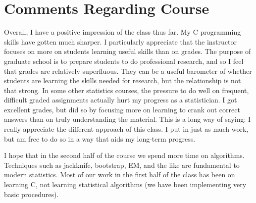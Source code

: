 \documentclass{report}
\begin{document}
\clearpage
\section*{Comments Regarding Course}

Overall, I have a positive impression of the class thus far. My C programming
skills have gotten much sharper. I particularly appreciate that the instructor
focuses on more on students learning useful skills than on grades. The purpose of
graduate school is to prepare students to do professional research, and so 
I feel that grades are relatively superfluous. They can be a useful
barometer of whether students are learning the skills needed for research, but the
relationship is not that strong. In some other statistics courses, the pressure 
to do well on frequent, difficult graded assignments actually hurt my
progress as a statistician. I got excellent grades, but did so by focusing more on 
learning to crank out correct answers than on truly understanding the material.
This is a long way of saying: I really appreciate the different approach of this
class. I put in just as much work, but am free to do so in a way that aids my
long-term progress. 

I hope that in the second half of the course we spend more time on algorithms.
Techniques such as jackknife, bootstrap, EM, and the like are fundamental to
modern statistics. Most of our work in the first half of the class has been on
learning C, not learning statistical algorithms (we have been implementing very
basic procedures). 
\end{document}
